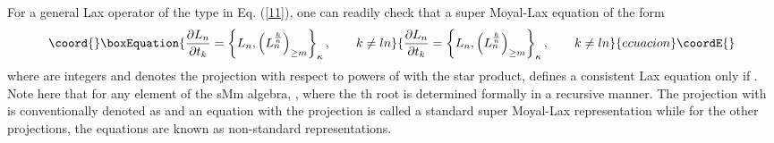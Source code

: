 \documentclass[a4paper,11pt]{article}
\begin{document}
For a general Lax operator of the type in Eq. (\ref{11}), one can
readily check that a super Moyal-Lax equation of the form
\begin{equation}\coord{}\boxEquation{
{\partial L_{n}\over \partial t_{k}} = \left\{L_{n}, \left(L_{n}^{k\over
n}\right)_{\geq m}\right\}_{\kappa},\qquad k\neq ln
}{
{\partial L_{n}\over \partial t_{k}} = \left\{L_{n}, \left(L_{n}^{k\over
n}\right)_{\geq m}\right\}_{\kappa},\qquad k\neq ln
}{ecuacion}\coordE{}\end{equation}
where \coordHE{} are integers and \coordHE{} denotes the projection with
respect to powers of \myHighlight{$\Pi$}\coordHE{} with the star product, defines a consistent
Lax equation only if \coordHE{}. Note here that for any element \coordHE{} of the
sMm algebra, \coordHE{}, where the \coordHE{}th root is determined formally in a
recursive manner. The projection with \coordHE{} is conventionally denoted
as \myHighlight{$()_{+}$}\coordHE{} and an equation with the projection \coordHE{} is called a
standard super Moyal-Lax representation while for the other
projections, the equations are known as non-standard representations.
\end{document}
